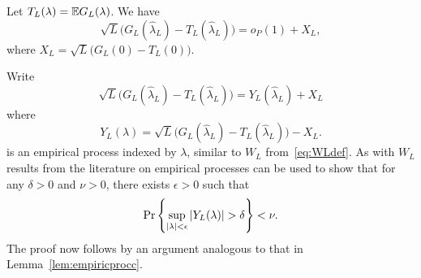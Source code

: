 \documentclass[journal]{IEEEtran}
\begin{document}
\begin{lemma}\label{lem:empiricprocforrho} Let $T_L(\lambda) = {\mathbb E} G_L(\lambda)$.  We have
\[
\sqrt{L}\big( G_L(\hat{\lambda}_L) - T_L(\hat{\lambda}_L) \big) = o_P(1) + X_L,
\]
where $X_L = \sqrt{L} \big( G_L(0) - T_L(0) \big)$.
\end{lemma}
\begin{IEEEproof}
Write
\[
\sqrt{L}\big( G_L(\hat{\lambda}_L) - T_L(\hat{\lambda}_L) \big) = Y_L(\hat{\lambda}_L) + X_L
\]
where
\begin{equation}\label{eq:YLdef}
Y_L(\lambda) = \sqrt{L}\big( G_L(\hat{\lambda}_L) - T_L(\hat{\lambda}_L) \big) - X_L.
\end{equation}
is an empirical process indexed by $\lambda$, similar to $W_L$ from~\eqref{eq:WLdef}.  As with $W_L$ results from the literature on empirical processes can be used to show that  
for any $\delta > 0$ and $\nu > 0$, there exists $\epsilon > 0$ such that
\[
\Pr\left\{ \sup_{{\vert \lambda \vert}<\epsilon}{\vert Y_L(\lambda) \vert} > \delta  \right\} < \nu.
\]
The proof now follows by an argument analogous to that in Lemma~\ref{lem:empiricprocc}.
\end{IEEEproof}
\end{document}
